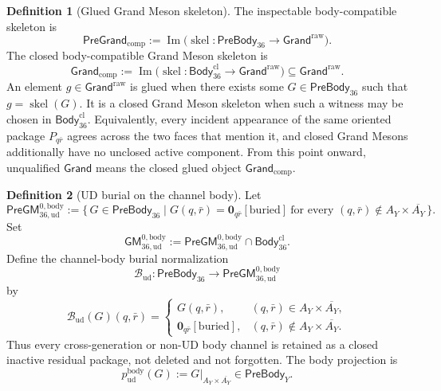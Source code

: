\documentclass[11pt]{article}
\theoremstyle{definition}
\newtheorem{definition}{Definition}
\theoremstyle{plain}
\DeclareMathOperator{\skel}{skel}
\newcommand{\qu}{\mathrm u}
\newcommand{\qd}{\mathrm d}
\begin{document}
\begin{definition}[Glued Grand Meson skeleton]
The inspectable body-compatible skeleton is
\[
  \mathsf{PreGrand}_{\mathrm{comp}}
  :=
  \operatorname{Im}
  \bigl(\skel:\mathsf{PreBody}_{36}\to\mathsf{Grand}^{\mathrm{raw}}\bigr).
\]
The closed body-compatible Grand Meson skeleton is
\[
  \mathsf{Grand}_{\mathrm{comp}}
  :=
  \operatorname{Im}
  \bigl(\skel:\mathsf{Body}_{36}^{\mathrm{cl}}
  \to\mathsf{Grand}^{\mathrm{raw}}\bigr)
  \subseteq
  \mathsf{Grand}^{\mathrm{raw}}.
\]
An element \(g\in\mathsf{Grand}^{\mathrm{raw}}\) is glued when there exists
some \(G\in\mathsf{PreBody}_{36}\) such that \(g=\skel(G)\).  It is a
closed Grand Meson skeleton when such a witness may be chosen in
\(\mathsf{Body}_{36}^{\mathrm{cl}}\).  Equivalently, every incident
appearance of the same oriented package \(P_{q\bar r}\) agrees across the
two faces that mention it, and closed Grand Mesons additionally have no
unclosed active component.  From this point onward, unqualified
\(\mathsf{Grand}\) means the closed glued object
\(\mathsf{Grand}_{\mathrm{comp}}\).
\end{definition}

\begin{definition}[UD burial on the channel body]
Let
\[
  \mathsf{PreGM}_{36,\qu\qd}^{0,\mathrm{body}}
  :=
  \{\,G\in\mathsf{PreBody}_{36}\mid
  G(q,\bar r)=\mathbf 0_{q\bar r}[\mathrm{buried}]
  \ \text{for every }(q,\bar r)\notin
  A_Y\times\overline{A_Y}\,\}.
\]
Set
\[
  \mathsf{GM}_{36,\qu\qd}^{0,\mathrm{body}}
  :=
  \mathsf{PreGM}_{36,\qu\qd}^{0,\mathrm{body}}
  \cap
  \mathsf{Body}_{36}^{\mathrm{cl}}.
\]
Define the channel-body burial normalization
\[
  \mathcal B_{\qu\qd}:\mathsf{PreBody}_{36}\to
  \mathsf{PreGM}_{36,\qu\qd}^{0,\mathrm{body}}
\]
by
\[
  \mathcal B_{\qu\qd}(G)(q,\bar r)
  =
  \begin{cases}
    G(q,\bar r), & (q,\bar r)\in A_Y\times\overline{A_Y},\\
    \mathbf 0_{q\bar r}[\mathrm{buried}],
      & (q,\bar r)\notin A_Y\times\overline{A_Y}.
  \end{cases}
\]
Thus every cross-generation or non-UD body channel is retained as a closed
inactive residual package, not deleted and not forgotten.
The body projection is
\[
  p^{\mathrm{body}}_{\qu\qd}(G)
  :=
  G|_{A_Y\times\overline{A_Y}}
  \in\mathsf{PreBody}_{Y}.
\]
\end{definition}
\end{document}
